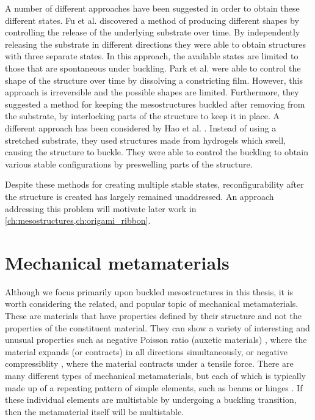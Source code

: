 A number of different approaches have been suggested in order to obtain these different states.
Fu et al. \cite{Fu2018} discovered a method of producing different shapes by controlling the release of the underlying substrate over time.
By independently releasing the substrate in different directions they were able to obtain structures with three separate states.
In this approach, the available states are limited to those that are spontaneous under buckling.
Park et al. \cite{Park2019} were able to control the shape of the structure over time by dissolving a constricting film.
However, this approach is irreversible and the possible shapes are limited.
Furthermore, they suggested a method for keeping the mesostructures buckled after removing from the substrate, by interlocking parts of the structure to keep it in place.
A different approach has been considered by Hao et al. \cite{Hao2020}.
Instead of using a stretched substrate, they used structures made from hydrogels which swell, causing the structure to buckle.
They were able to control the buckling to obtain various stable configurations by preswelling parts of the structure.

Despite these methods for creating multiple stable states, reconfigurability after the structure is created has largely remained unaddressed.
An approach addressing this problem will motivate later work in \cref{ch:mesostructures,ch:origami_ribbon}.



\section{Mechanical metamaterials}\label{sec:es-metamaterials}
Although we focus primarily upon buckled mesostructures in this thesis, it is worth considering the related, and popular topic of mechanical metamaterials.
These are materials that have properties defined by their structure and not the properties of the constituent material.
They can show a variety of interesting and unusual properties such as negative Poisson ratio (auxetic materials) \cite{Bertoldi2017,Bertoldi2017a}, where the material expands (or contracts) in all directions simultaneously, or negative compressiblity \cite{Nicolaou2012,Lakes2001}, where the material contracts under a tensile force.
There are many different types of mechanical metamaterials, but each of which is typically made up of a repeating pattern of simple elements, such as beams or hinges \cite{Bertoldi2017}.
If these individual elements are multistable by undergoing a buckling transition, then the metamaterial itself will be multistable.

